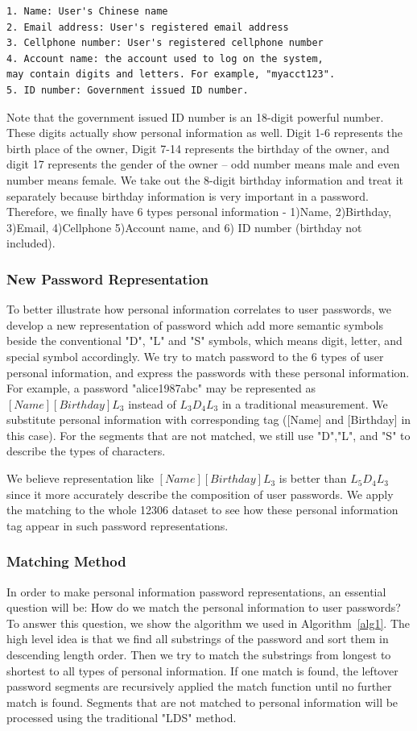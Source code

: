 \documentclass{sig-alternate}
\begin{document}
\begin{verbatim}
1. Name: User's Chinese name
2. Email address: User's registered email address
3. Cellphone number: User's registered cellphone number
4. Account name: the account used to log on the system, 
may contain digits and letters. For example, "myacct123".
5. ID number: Government issued ID number.
\end{verbatim}

Note that the government issued ID number is an 18-digit powerful number. These digits actually show personal information as well. Digit 1-6 represents the birth place of the owner, Digit 7-14 represents the birthday of the owner, and digit 17 represents the gender of the owner -- odd number means male and even number means female. We take out the 8-digit birthday information and treat it separately because birthday information is very important in a password. Therefore, we finally have 6 types personal information - 1)Name, 2)Birthday, 3)Email, 4)Cellphone 5)Account name, and 6) ID number (birthday not included). 

\subsubsection{New Password Representation}
To better illustrate how personal information correlates to user passwords, we develop a new representation of password which add more semantic symbols beside the conventional "D", "L" and "S" symbols, which means digit, letter, and special symbol accordingly. We try to match password to the 6 types of user personal information, and express the passwords with these personal information. For example, a password "alice1987abc" may be represented as $[Name][Birthday]L_3$ instead of $L_3D_4L_3$ in a traditional measurement. We substitute personal information with corresponding tag ([Name] and [Birthday] in this case). For the segments that are not matched, we still use "D","L", and "S" to describe the types of characters.

We believe representation like $[Name][Birthday]L_3$ is better than $L_5D_4L_3$ since it more accurately describe the composition of user passwords. We apply the matching to the whole 12306 dataset to see how these personal information tag appear in such password representations.

\subsubsection{Matching Method}
\label{matchingmethod}
In order to make personal information password representations, an essential question will be: How do we match the personal information to user passwords? To answer this question, we show the algorithm we used in Algorithm~\ref{alg1}. The high level idea is that we find all substrings of the password and sort them in descending length order. Then we try to match the substrings from longest to shortest to all types of personal information. If one match is found, the leftover password segments are recursively applied the match function until no further match is found. Segments that are not matched to personal information will be processed using the traditional "LDS" method.
\end{document}
